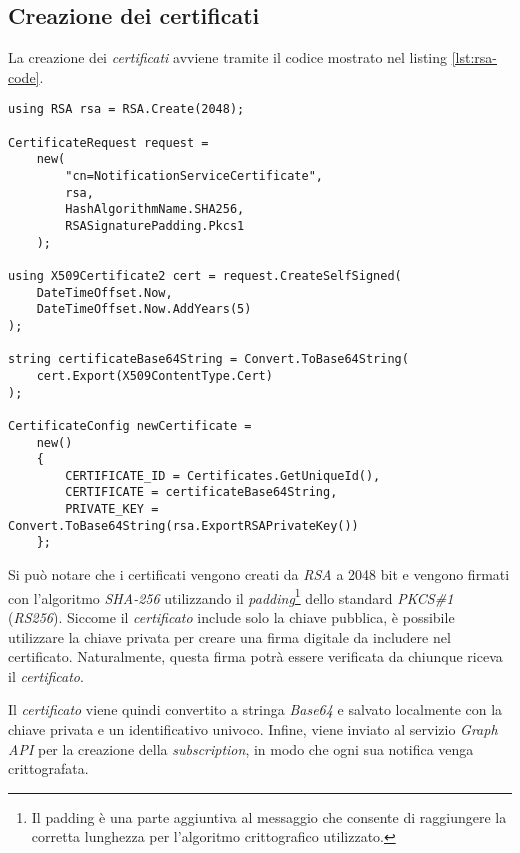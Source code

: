 \subsection{Creazione dei certificati}

\noindent La creazione dei \emph{certificati} avviene tramite il codice mostrato nel listing \ref{lst:rsa-code}.



\begin{lstlisting}[caption=Codice per la creazione di certificati tramite RSA, label=lst:rsa-code]
using RSA rsa = RSA.Create(2048);

CertificateRequest request =
	new(
		"cn=NotificationServiceCertificate",
		rsa,
		HashAlgorithmName.SHA256,
		RSASignaturePadding.Pkcs1
	);

using X509Certificate2 cert = request.CreateSelfSigned(
	DateTimeOffset.Now,
	DateTimeOffset.Now.AddYears(5)
);

string certificateBase64String = Convert.ToBase64String(
	cert.Export(X509ContentType.Cert)
);

CertificateConfig newCertificate =
	new()
	{
		CERTIFICATE_ID = Certificates.GetUniqueId(),
		CERTIFICATE = certificateBase64String,
		PRIVATE_KEY = Convert.ToBase64String(rsa.ExportRSAPrivateKey())
	};
\end{lstlisting}

\bigskip

Si può notare che i certificati vengono creati da \emph{RSA} a 2048 bit e vengono firmati con l'algoritmo \emph{SHA-256} utilizzando il \emph{padding}\footnote{Il padding è una parte aggiuntiva al messaggio che consente di raggiungere la corretta lunghezza per l'algoritmo crittografico utilizzato.} dello standard \emph{PKCS\#1} (\emph{RS256}).
Siccome il \emph{certificato} include solo la chiave pubblica, è possibile utilizzare la chiave privata per creare una firma digitale da includere nel certificato. Naturalmente, questa firma potrà essere verificata da chiunque riceva il \emph{certificato}.

Il \emph{certificato} viene quindi convertito a stringa \emph{Base64} e salvato localmente con la chiave privata e un identificativo univoco.
Infine, viene inviato al servizio \emph{Graph API} per la creazione della \emph{subscription}, in modo che ogni sua notifica venga crittografata.

